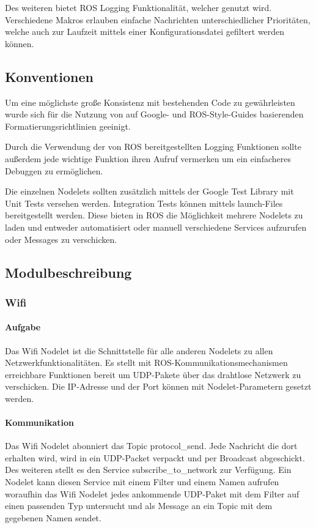\documentclass[a4paper, 12pt, titlepage]{scrartcl}
\begin{document}
			Des weiteren bietet ROS Logging Funktionalität, welcher genutzt wird. Verschiedene Makros erlauben einfache Nachrichten unterschiedlicher Prioritäten, welche auch zur Laufzeit mittels einer Konfigurationsdatei gefiltert werden können.
			
			\subsection{Konventionen}
			\label{sw_b_konventionen}
			
			Um eine möglichste große Konsistenz mit bestehenden Code zu gewährleisten wurde sich für die Nutzung von auf Google- und ROS-Style-Guides\cite{googleTest} basierenden Formatierungsrichtlinien geeinigt.
			
			Durch die Verwendung der von ROS bereitgestellten Logging Funktionen sollte außerdem jede wichtige Funktion ihren Aufruf vermerken um ein einfacheres Debuggen zu ermöglichen.
			
			Die einzelnen Nodelets sollten zusätzlich mittels der Google Test Library\cite{google} mit Unit Tests versehen werden. Integration Tests können mittels launch-Files bereitgestellt werden. Diese bieten in ROS die Möglichkeit mehrere Nodelets zu laden und entweder automatisiert oder manuell verschiedene Services aufzurufen oder Messages zu verschicken.
			
			\subsection{Modulbeschreibung}
				\subsubsection{Wifi}
    			\label{sw_b_wifi}
				\paragraph{Aufgabe} Das Wifi Nodelet ist die Schnittstelle für alle anderen Nodelets zu allen Netzwerkfunktionalitäten. Es stellt mit ROS-Kommunikationsmechanismen erreichbare Funktionen bereit um UDP-Pakete über das drahtlose Netzwerk zu verschicken. Die IP-Adresse und der Port können mit Nodelet-Parametern gesetzt werden.
				
				\paragraph{Kommunikation} Das Wifi Nodelet abonniert das Topic protocol\_send. Jede Nachricht die dort erhalten wird, wird in ein UDP-Packet verpackt und per Broadcast abgeschickt. Des weiteren stellt es den Service subscribe\_to\_network zur Verfügung. Ein Nodelet kann diesen Service mit einem Filter und einem Namen aufrufen woraufhin das Wifi Nodelet jedes ankommende UDP-Paket mit dem Filter auf einen passenden Typ untersucht und als Message an ein Topic mit dem gegebenen Namen sendet.
				
\end{document}
